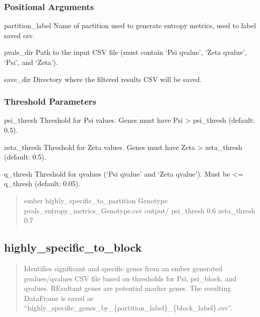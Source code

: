 \documentclass[letterpaper,10pt,english]{sphinxmanual}
\begin{document}
\subsubsection{Positional Arguments}
\label{\detokenize{cli:positional-arguments_repeat6}}\begin{optionlist}{3cm}
\item [partition\_label]  
\sphinxAtStartPar
Name of partition used to generate entropy metrics, used to label saved csv.
\item [pvals\_dir]  
\sphinxAtStartPar
Path to the input CSV file (must contain ‘Psi q\sphinxhyphen{}value’, ‘Zeta q\sphinxhyphen{}value’, ‘Psi’, and ‘Zeta’).
\item [save\_dir]  
\sphinxAtStartPar
Directory where the filtered results CSV will be saved.
\end{optionlist}


\subsubsection{Threshold Parameters}
\label{\detokenize{cli:threshold-parameters}}\begin{optionlist}{3cm}
\item [\sphinxhyphen{}\sphinxhyphen{}psi\_thresh]  
\sphinxAtStartPar
Threshold for Psi values. Genes must have Psi \textgreater{} psi\_thresh (default: 0.5).
\item [\sphinxhyphen{}\sphinxhyphen{}zeta\_thresh]  
\sphinxAtStartPar
Threshold for Zeta values. Genes must have Zeta \textgreater{} zeta\_thresh (default: 0.5).
\item [\sphinxhyphen{}\sphinxhyphen{}q\_thresh]  
\sphinxAtStartPar
Threshold for q\sphinxhyphen{}values (‘Psi q\sphinxhyphen{}value’ and ‘Zeta q\sphinxhyphen{}value’). Must be \textless{}= q\_thresh (default: 0.05).
\end{optionlist}
\begin{quote}
\begin{description}
\sphinxAtStartPar
ember highly\_specific\_to\_partition Genotype pvals\_entropy\_metrics\_Genotype.csv output/ \textendash{}psi\_thresh 0.6 \textendash{}zeta\_thresh 0.7

\end{description}
\end{quote}


\subsection{highly\_specific\_to\_block}
\label{\detokenize{cli:highly_specific_to_block}}\begin{quote}

\sphinxAtStartPar
Identifies significant and specific genes from an ember generated
p\sphinxhyphen{}values/q\sphinxhyphen{}values CSV file based on thresholds for Psi, psi\_block, and q\sphinxhyphen{}values.
REsultant genes are potential marker genes.
The resulting DataFrame is saved as “highly\_specific\_genes\_by\_\{partition\_label\}\_\{block\_label\}.csv”.
\end{quote}
\end{document}
